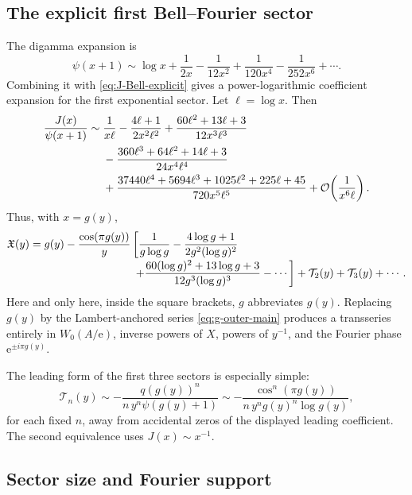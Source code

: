 \documentclass[11pt,oneside]{article}
\theoremstyle{plain}
\theoremstyle{definition}
\theoremstyle{remark}
\newcommand{\ee}{\mathrm{e}}
\newcommand{\Xfrak}{\mathfrak{X}}
\newcommand{\Tcal}{\mathcal{T}}
\newcommand{\bigO}{\mathcal{O}}
\begin{document}
\subsection{The explicit first Bell--Fourier sector}

The digamma expansion is
\begin{equation}
 \psi(x+1)\sim
 \log x+\frac1{2x}-\frac1{12x^2}+\frac1{120x^4}
 -\frac1{252x^6}+\cdots.
 \label{eq:digamma-expansion}
\end{equation}
Combining it with \eqref{eq:J-Bell-explicit} gives a power-logarithmic
coefficient expansion for the first exponential sector.  Let
\(\ell=\log x\).  Then
\begin{align}
 \frac{J(x)}{\psi(x+1)}\sim{}&
 \frac{1}{x\ell}
 -\frac{4\ell+1}{2x^2\ell^2}
 +\frac{60\ell^2+13\ell+3}{12x^3\ell^3}
 \notag\\
 &-\frac{360\ell^3+64\ell^2+14\ell+3}{24x^4\ell^4}
 \notag\\
 &+\frac{37440\ell^4+5694\ell^3+1025\ell^2+225\ell+45}
 {720x^5\ell^5}
 +\bigO\!\left(\frac1{x^6\ell}\right).
 \label{eq:J-over-psi}
\end{align}
Thus, with \(x=g(y)\),
\begin{align}
 \Xfrak(y)={}&g(y)
 -\frac{\cos(\pi g(y))}{y}
 \left[
 \frac{1}{g\log g}
 -\frac{4\log g+1}{2g^2(\log g)^2}
 \right.\notag\\[-0.2em]
 &\left.\hspace{8em}
 +\frac{60(\log g)^2+13\log g+3}{12g^3(\log g)^3}
 -\cdots
 \right]
 +\Tcal_2(y)+\Tcal_3(y)+\cdots.
 \label{eq:X-first-explicit}
\end{align}
Here and only here, inside the square brackets, \(g\) abbreviates \(g(y)\).
Replacing \(g(y)\) by the Lambert-anchored series
\eqref{eq:g-outer-main} produces a transseries entirely in
\(W_0(A/\ee)\), inverse powers of \(X\), powers of \(y^{-1}\), and the Fourier
phase \(\ee^{\pm i\pi g(y)}\).

The leading form of the first three sectors is especially simple:
\begin{equation}
 \Tcal_n(y)\sim-\frac{q(g(y))^n}{n\,y^n\psi(g(y)+1)}
 \sim-\frac{\cos^n(\pi g(y))}
 {n\,y^n g(y)^n\log g(y)},
 \label{eq:Tn-leading}
\end{equation}
for each fixed \(n\), away from accidental zeros of the displayed leading
coefficient.  The second equivalence uses \(J(x)\sim x^{-1}\).

\subsection{Sector size and Fourier support}
\end{document}
